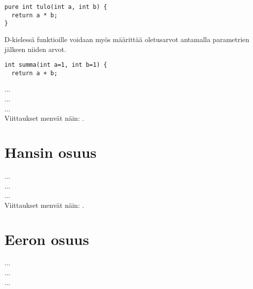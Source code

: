 \documentclass[11pt,oneside,a4paper]{article}
\begin{document}
\begin{verbatim}
pure int tulo(int a, int b) {
  return a * b;
}
\end{verbatim}

D-kielessä funktioille voidaan myös määrittää oletusarvot antamalla parametrien jälkeen niiden arvot.
\begin{verbatim}
int summa(int a=1, int b=1) {
  return a + b;
\end{verbatim}



... \\
... \\
... \\

Viittaukset menvät näin: \cite{ALE10}.

\section{Hansin osuus}
... \\
... \\
... \\

Viittaukset menvät näin: \cite{ERL99}.

\section{Eeron osuus}
... \\
... \\
... \\
\end{document}
